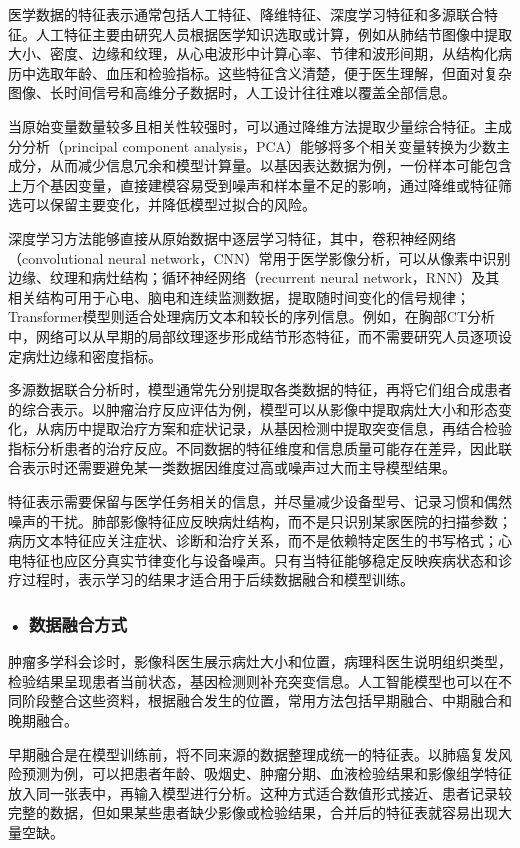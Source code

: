 医学数据的特征表示通常包括人工特征、降维特征、深度学习特征和多源联合特征。人工特征主要由研究人员根据医学知识选取或计算，例如从肺结节图像中提取大小、密度、边缘和纹理，从心电波形中计算心率、节律和波形间期，从结构化病历中选取年龄、血压和检验指标。这些特征含义清楚，便于医生理解，但面对复杂图像、长时间信号和高维分子数据时，人工设计往往难以覆盖全部信息。

当原始变量数量较多且相关性较强时，可以通过降维方法提取少量综合特征。主成分分析（principal component analysis，PCA）能够将多个相关变量转换为少数主成分，从而减少信息冗余和模型计算量。以基因表达数据为例，一份样本可能包含上万个基因变量，直接建模容易受到噪声和样本量不足的影响，通过降维或特征筛选可以保留主要变化，并降低模型过拟合的风险。

深度学习方法能够直接从原始数据中逐层学习特征，其中，卷积神经网络（convolutional neural network，CNN）常用于医学影像分析，可以从像素中识别边缘、纹理和病灶结构；循环神经网络（recurrent neural network，RNN）及其相关结构可用于心电、脑电和连续监测数据，提取随时间变化的信号规律；Transformer模型则适合处理病历文本和较长的序列信息。例如，在胸部CT分析中，网络可以从早期的局部纹理逐步形成结节形态特征，而不需要研究人员逐项设定病灶边缘和密度指标。

多源数据联合分析时，模型通常先分别提取各类数据的特征，再将它们组合成患者的综合表示。以肿瘤治疗反应评估为例，模型可以从影像中提取病灶大小和形态变化，从病历中提取治疗方案和症状记录，从基因检测中提取突变信息，再结合检验指标分析患者的治疗反应。不同数据的特征维度和信息质量可能存在差异，因此联合表示时还需要避免某一类数据因维度过高或噪声过大而主导模型结果。

特征表示需要保留与医学任务相关的信息，并尽量减少设备型号、记录习惯和偶然噪声的干扰。肺部影像特征应反映病灶结构，而不是只识别某家医院的扫描参数；病历文本特征应关注症状、诊断和治疗关系，而不是依赖特定医生的书写格式；心电特征也应区分真实节律变化与设备噪声。只有当特征能够稳定反映疾病状态和诊疗过程时，表示学习的结果才适合用于后续数据融合和模型训练。


\subsubsection*{\textbf{• 数据融合方式}}

肿瘤多学科会诊时，影像科医生展示病灶大小和位置，病理科医生说明组织类型，检验结果呈现患者当前状态，基因检测则补充突变信息。人工智能模型也可以在不同阶段整合这些资料，根据融合发生的位置，常用方法包括早期融合、中期融合和晚期融合。

早期融合是在模型训练前，将不同来源的数据整理成统一的特征表。以肺癌复发风险预测为例，可以把患者年龄、吸烟史、肿瘤分期、血液检验结果和影像组学特征放入同一张表中，再输入模型进行分析。这种方式适合数值形式接近、患者记录较完整的数据，但如果某些患者缺少影像或检验结果，合并后的特征表就容易出现大量空缺。

